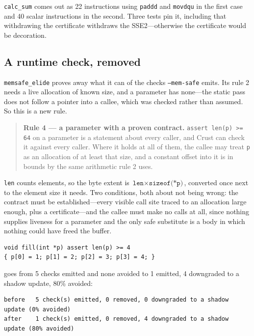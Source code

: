 \documentclass[11pt]{article}
\newcommand{\code}[1]{\texttt{#1}}
\begin{document}
\code{calc\_sum} comes out as 22 instructions using \code{paddd} and
\code{movdqu} in the first case and 40 scalar instructions in the second.
Three tests pin it, including that withdrawing the certificate withdraws the
SSE2---otherwise the certificate would be decoration.

\subsection{A runtime check, removed}

\code{memsafe\_elide} proves away what it can of the checks
\code{--mem-safe} emits. Its rule 2 needs a live allocation of known size, and
a parameter has none---the static pass does not follow a pointer into a
callee, which was checked rather than assumed. So this is a new rule.

\begin{quote}
\textbf{Rule 4 --- a parameter with a proven contract.} \code{assert len(p) >=
64} on a parameter is a statement about every caller, and Crust can check it
against every caller. Where it holds at all of them, the callee may treat
\code{p} as an allocation of at least that size, and a constant offset into it
is in bounds by the same arithmetic rule 2 uses.
\end{quote}

\code{len} counts elements, so the byte extent is $\code{len} \times
\code{sizeof(*p)}$, converted once next to the element size it needs. Two
conditions, both about not being wrong: the contract must be
established---every visible call site traced to an allocation large enough,
plus a certificate---and the callee must make no calls at all, since nothing
supplies liveness for a parameter and the only safe substitute is a body in
which nothing could have freed the buffer.

\begin{lstlisting}[language=crustc]
void fill(int *p) assert len(p) >= 4
{ p[0] = 1; p[1] = 2; p[2] = 3; p[3] = 4; }
\end{lstlisting}

goes from 5 checks emitted and none avoided to 1 emitted, 4 downgraded to a
shadow update, 80\% avoided:

\begin{lstlisting}[language={}]
before   5 check(s) emitted, 0 removed, 0 downgraded to a shadow update (0% avoided)
after    1 check(s) emitted, 0 removed, 4 downgraded to a shadow update (80% avoided)
\end{lstlisting}
\end{document}
